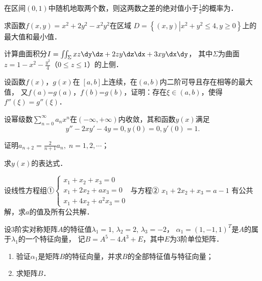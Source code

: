 \documentclass[plain,noanswer,medmath]{../../template/jnuexam}
\begin{document}
\begin{problem}
在区间$(0,1)$中随机地取两个数，则这两数之差的绝对值小于$\frac{1}{2}$的概率为\fillin{}．
\end{problem}




\begin{problem}[points=10]
求函数$f(x,y) = x^2 + 2y^2 - x^2y^2$在区域
$D = \left\{(x,y)\left| x^2 + y^2 \le 4,y \ge 0 \right. \right\}$上的最大值和最小值．
\end{problem}


\begin{problem}[points=11]
计算曲面积分$I = \iint_{\Sigma}xz\dy\dz + 2zy\dz\dx + 3xy \dx\dy$，
其中$\Sigma$为曲面$z = 1 - x^2 - \frac{y^2}{4}$（$0 \le z \le 1$）的上侧．
\end{problem}


\begin{problem}[points=11]
设函数$f(x)$，$g(x)$在$\;\left[a,b \right]$上连续，在$(a,b)$内二阶可导且存在相等的最大值，
又$f(a)$=$g(a)$，$f(b)$=$g(b)$，证明：存在$\xi \in(a,b)$，使得$f''(\xi) = g''(\xi)$．
\end{problem}


\begin{problem}[points=10]
设幂级数$\sum_{n = 0}^{\infty}a_n x^n$在$(-\infty , +\infty)$内收敛，其和函数$y(x)$满足
$$y'' - 2xy' - 4y = 0,y(0) = 0,y'(0) = 1.$$
\begin{enumerate*}
  \item 证明$a_{n + 2} = \frac{2}{n + 1}a_n,\;n = 1,2, \cdots$；
  \item 求$y(x)$的表达式．
\end{enumerate*}
\end{problem}

\begin{problem}[points=11]
设线性方程组①$\begin{cases}
  x_1 + x_2 + x_3 = 0 \\
  x_1 + 2x_2 + ax_3 = 0 \\
  x_1 + 4x_2 + a^2x_3 = 0
\end{cases}$
与方程②       $x_1 + 2x_2 + x_3 = a - 1$
有公共解，求$a$的值及所有公共解．
\end{problem}


\begin{problem}[points=11]
设$3$阶实对称矩阵$A$的特征值$\lambda_1 = 1$, $\lambda_2 = 2$, $\lambda_3 = - 2$，
$\alpha_1 = (1, - 1,1)^T$是$A$的属于$\lambda_1$的一个特征向量，
记$B = A^5 - 4A^3 + E$，其中$E$为$3$阶单位矩阵．
\begin{enumerate}
  \item 验证$\alpha_1$是矩阵$B$的特征向量，并求$B$的全部特征值与特征向量；
  \item 求矩阵$B$．
\end{enumerate}
\end{problem}
\end{document}

